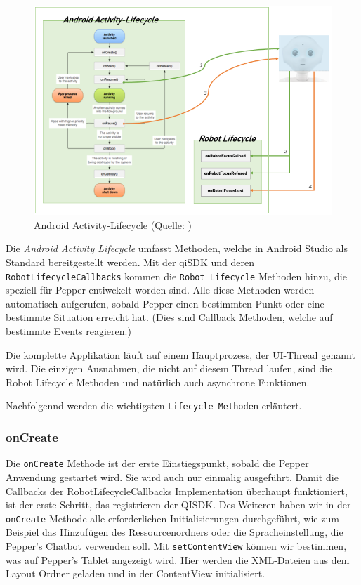 \begin{figure}[H]
    \includegraphics[width=\textwidth]{Figures/AppChapter/4_1_3.png}
    \caption{Android Activity-Lifecycle (Quelle: \cite{AALife})}
    \label{fig:AAL}
    \centering
\end{figure}

Die \textit{Android Activity Lifecycle} umfasst Methoden, welche in Android Studio als Standard bereitgestellt werden. Mit der qiSDK und deren \verb|RobotLifecycleCallbacks| kommen die \verb|Robot Lifecycle| Methoden hinzu, die speziell für Pepper entiwckelt worden sind. Alle diese Methoden werden automatisch aufgerufen, sobald Pepper einen bestimmten Punkt oder eine bestimmte Situation erreicht hat. (Dies sind Callback Methoden, welche auf bestimmte Events reagieren.)

Die komplette Applikation läuft auf einem Hauptprozess, der UI-Thread genannt wird. Die einzigen Ausnahmen, die nicht auf diesem Thread laufen, sind die Robot Lifecycle Methoden und natürlich auch asynchrone Funktionen.

Nachfolgennd werden die wichtigsten \verb|Lifecycle-Methoden| erläutert.

\subsubsection{onCreate}

Die \verb|onCreate| Methode ist der erste Einstiegspunkt, sobald die Pepper Anwendung gestartet wird. Sie wird auch nur einmalig ausgeführt. Damit die Callbacks der RobotLifecycleCallbacks Implementation überhaupt funktioniert, ist der erste Schritt, das registrieren der QISDK. Des Weiteren haben wir in der \verb|onCreate| Methode alle erforderlichen Initialisierungen durchgeführt, wie zum Beispiel das Hinzufügen des Ressourcenordners oder die Spracheinstellung, die Pepper's Chatbot verwenden soll.
Mit \verb|setContentView| können wir bestimmen, was auf Pepper's Tablet angezeigt wird. Hier werden die XML-Dateien aus dem Layout Ordner geladen und in der ContentView initialisiert. \\

